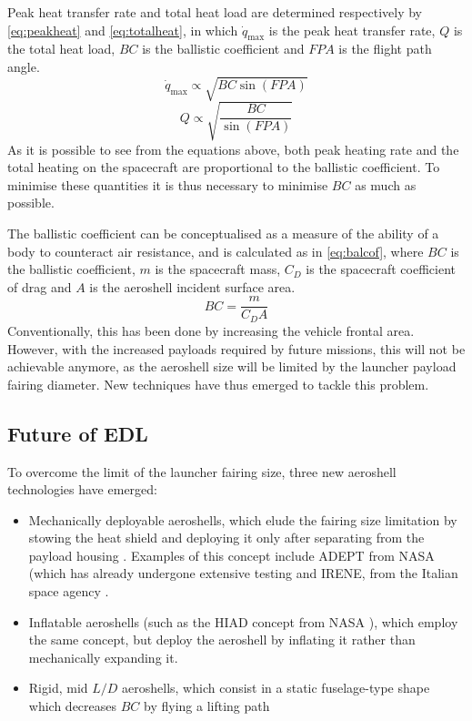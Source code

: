 Peak heat transfer rate and total heat load are determined respectively by \autoref{eq:peakheat} and \autoref{eq:totalheat}, in which $\dot{q}_{\max }$ is the peak heat transfer rate, $Q$ is the total heat load, $BC$ is the ballistic coefficient and $FPA$ is the flight path angle.
\begin{equation}
    \dot{q}_{\max } \propto \sqrt{B C \sin (FPA)}
    \label{eq:peakheat}
\end{equation}
\begin{equation}
    Q \propto \sqrt{\frac{B C}{\sin (FPA)}}
    \label{eq:totalheat}
\end{equation}
As it is possible to see from the equations above, both peak heating rate and the total heating on the spacecraft are proportional to the ballistic coefficient. To minimise these quantities it is thus necessary to minimise $BC$ as much as possible. 

The ballistic coefficient can be conceptualised as a measure of the ability of a body to counteract air resistance, and is calculated as in \autoref{eq:balcof}, where $BC$ is the ballistic coefficient, $m$ is the spacecraft mass, $C_D$ is the spacecraft coefficient of drag and $A$ is the aeroshell incident surface area.
\begin{equation}
    B C=\frac{m}{C_D A}
    \label{eq:balcof}
\end{equation}
Conventionally, this has been done by increasing the vehicle frontal area. However, with the increased payloads required by future missions, this will not be achievable anymore, as the aeroshell size will be limited by the launcher payload fairing diameter. New techniques have thus emerged to tackle this problem.

\subsection{Future of EDL}
To overcome the limit of the launcher fairing size, three new aeroshell technologies have emerged:
\begin{itemize}
    \item Mechanically deployable aeroshells, which elude the fairing size limitation by stowing the heat shield and deploying it only after separating from the payload housing \cite{aerothermonotes}. Examples of this concept include ADEPT from NASA \cite{adeptfeasibility} (which has already undergone extensive testing \cite{adepttest} and IRENE, from the Italian space agency \cite{irene}.
    \item Inflatable aeroshells (such as the HIAD concept from NASA \cite{hiad}), which employ the same concept, but deploy the aeroshell by inflating it rather than mechanically expanding it. 
    \item Rigid, mid $L/D$ aeroshells, which consist in a static fuselage-type shape which decreases $BC$ by flying a lifting path \cite{aerothermonotes, midld}
\end{itemize}

